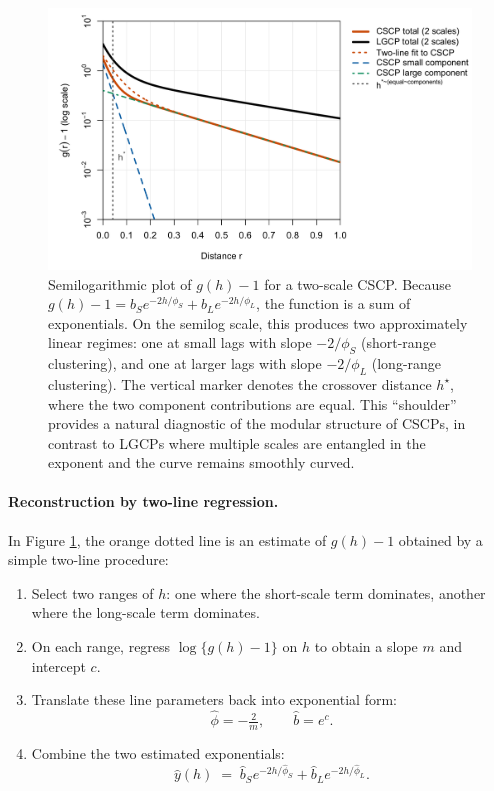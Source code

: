 \documentclass[11pt]{article}
\begin{document}
\begin{figure}[h]
	\centering
	\includegraphics[width=1\textwidth]{semilog_gminus1_with_LGCP.png}
	\caption{Semilogarithmic plot of $g(h)-1$ for a two-scale CSCP. 
		Because $g(h)-1 = b_S e^{-2h/\phi_S} + b_L e^{-2h/\phi_L}$, the function is a sum of exponentials. 
		On the semilog scale, this produces two approximately linear regimes: one at small lags with slope $-2/\phi_S$ (short-range clustering), 
		and one at larger lags with slope $-2/\phi_L$ (long-range clustering). 
		The vertical marker denotes the crossover distance $h^\star$, where the two component contributions are equal. 
		This ``shoulder'' provides a natural diagnostic of the modular structure of CSCPs, 
		in contrast to LGCPs where multiple scales are entangled in the exponent and the curve remains smoothly curved.}
	\label{fig:csclgcp-semilog}
\end{figure}



\paragraph{Reconstruction by two-line regression.}
In Figure \ref{fig:csclgcp-semilog}, the orange dotted line is an {estimate} of $g(h)-1$ obtained by a simple two-line procedure:
\begin{enumerate}
	\item Select two ranges of $h$: one where the short-scale term dominates, another where the long-scale term dominates.
	\item On each range, regress $\log\{g(h)-1\}$ on $h$ to obtain a slope $m$ and intercept $c$.
	\item Translate these line parameters back into exponential form:
	\[
	\widehat{\phi} = -\tfrac{2}{m}, \qquad \widehat{b} = e^c.
	\]
	\item Combine the two estimated exponentials:
	\[
	\widehat{y}(h) \;=\; \widehat{b}_S e^{-2h/\widehat{\phi}_S} 
	+ \widehat{b}_L e^{-2h/\widehat{\phi}_L}.
	\]
\end{enumerate}
\end{document}

